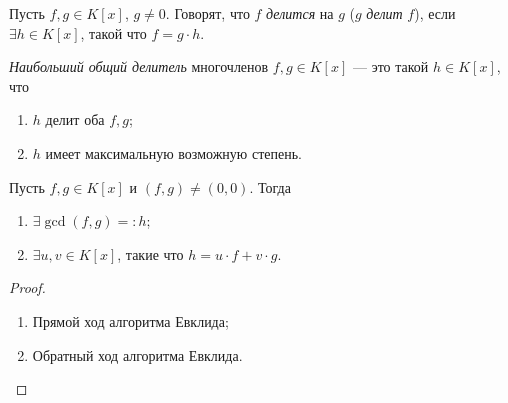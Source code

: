 \begin{comment}
    Доказательство дает алгоритм деления <<в столбик>>.
\end{comment}

\begin{definition}
    Пусть $f, g \in K[x]$, $g \neq 0$. Говорят, что $f$ \textit{делится} на $g$ ($g$ \textit{делит} $f$), если $\exists h \in K[x]$, такой что $f = g \cdot h$.
\end{definition}

\begin{definition}
    \textit{Наибольший общий делитель} многочленов $f, g \in K[x]$ --- это такой $h \in K[x]$, что
    \begin{enumerate}
    \item $h$ делит оба $f, g$;
    \item $h$ имеет максимальную возможную степень.
    \end{enumerate}
\end{definition}

\begin{theorem}
    Пусть $f, g \in K[x]$ и $(f, g) \neq (0, 0)$. Тогда
    \begin{enumerate}
        \item $\exists \gcd(f, g) =: h$;
        \item $\exists u, v \in K[x]$, такие что $h = u \cdot f + v \cdot g$.
    \end{enumerate}
\end{theorem}

\begin{proof}~
    \begin{enumerate}
    \item Прямой ход алгоритма Евклида;
    \item Обратный ход алгоритма Евклида.
    \end{enumerate}
\end{proof}

\begin{comment}
    $\gcd(f, g)$ определен однозначно с точностью до пропорциональности.

    $2 = \gcd(2x^2, 2x + 1) = 1$.
\end{comment}
